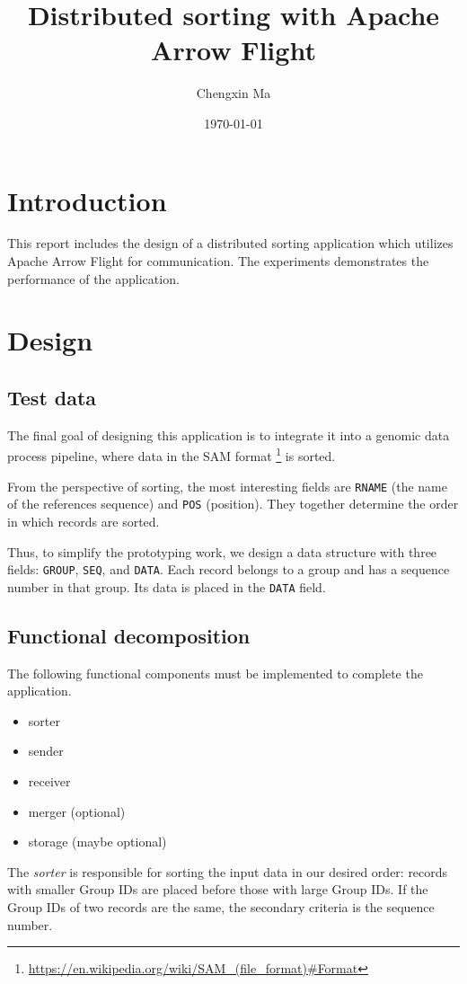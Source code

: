 \documentclass{article}
\title{Distributed sorting with Apache Arrow Flight}
\author{Chengxin Ma}
\date{\today}
\begin{document}
\maketitle

\section{Introduction}
This report includes the design of a distributed sorting application which utilizes Apache Arrow Flight for communication.
The experiments demonstrates the performance of the application.

\section{Design}
\subsection{Test data}
The final goal of designing this application is to integrate it into a genomic data process pipeline, where data in the SAM format
\footnote{\url{https://en.wikipedia.org/wiki/SAM_(file_format)\#Format}} is sorted.

From the perspective of sorting, the most interesting fields are \texttt{RNAME} (the name of the references sequence) and \texttt{POS} (position).
They together determine the order in which records are sorted.

Thus, to simplify the prototyping work, we design a data structure with three fields: \texttt{GROUP}, \texttt{SEQ}, and \texttt{DATA}.
Each record belongs to a group and has a sequence number in that group.
Its data is placed in the \texttt{DATA} field.

\subsection{Functional decomposition}

The following functional components must be implemented to complete the application.
\begin{itemize}
    \item sorter
    \item sender
    \item receiver
    \item merger (optional)
    \item storage (maybe optional)
\end{itemize}

The \textit{sorter} is responsible for sorting the input data in our desired order: records with smaller Group IDs are placed before those with large Group IDs.
If the Group IDs of two records are the same, the secondary criteria is the sequence number.
\end{document}
